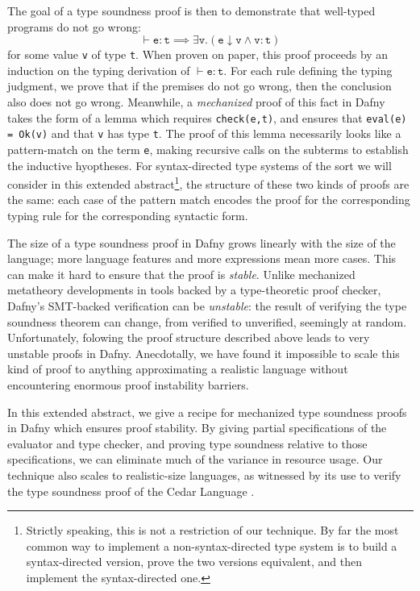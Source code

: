 \documentclass[sigplan,review,screen,anonymous]{acmart}
\begin{document}
The goal of a type soundness proof is then to demonstrate that well-typed
programs do not go wrong:
$$\vdash \texttt{e} : \texttt{t} \implies \exists \texttt{v}. \left(\texttt{e} \downarrow \texttt{v} \wedge \texttt{v} : \texttt{t}\right)$$
for some value \texttt{v} of type \texttt{t}. When proven
on paper, this proof proceeds by an induction on the typing derivation of
$\vdash \texttt{e} : \texttt{t}$. For each rule defining the typing judgment, we
prove that if the premises do not go wrong, then the conclusion also does not go
wrong. Meanwhile, a \emph{mechanized} proof of this fact in Dafny takes the form
of a lemma which requires \texttt{check(e,t)}, and ensures that \texttt{eval(e)
= Ok(v)} and that \texttt{v} has type \texttt{t}. The proof of this lemma
necessarily looks like a pattern-match on the term \texttt{e}, making recursive
calls on the subterms to establish the inductive hyoptheses. For syntax-directed type systems
of the sort we will consider in this extended abstract\footnote{Strictly speaking, this is not a restriction of our technique. By far the most common way to implement a non-syntax-directed type system is to build a syntax-directed version, prove the two versions equivalent, and then implement the syntax-directed one.},
the structure of these two kinds of proofs are the same: each case of the pattern match encodes the proof for the corresponding typing rule for the corresponding syntactic form.

The size of a type soundness proof in Dafny grows linearly with the
size of the language; more language features and more expressions mean more
cases.  This can make it hard to ensure that the proof is \emph{stable}.  Unlike
mechanized metatheory developments in tools backed by a type-theoretic proof
checker, Dafny's SMT-backed verification can be \emph{unstable}: the result of
verifying the type soundness theorem can change, from verified to unverified, seemingly at random. 
Unfortunately, folowing the proof structure described above leads to very unstable proofs in Dafny. Anecdotally, we have
found it impossible to scale this kind of proof to anything approximating a realistic language without encountering enormous
proof instability barriers.

In this extended abstract, we give a recipe for mechanized type soundness proofs
in Dafny which ensures proof stability.  By giving partial specifications of the
evaluator and type checker, and proving type soundness relative to those
specifications, we can eliminate much of the variance in resource usage.  Our
technique also scales to realistic-size languages, as witnessed by its use to
verify the type soundness proof of the Cedar Language \cite{cedar}.
\end{document}
